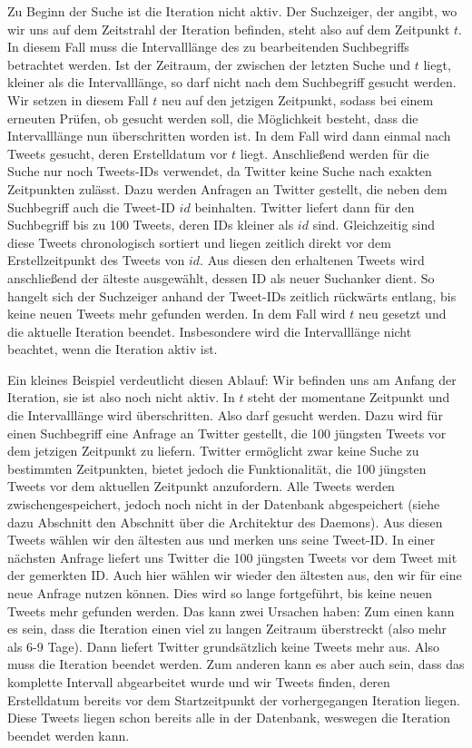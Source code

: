 Zu Beginn der Suche ist die Iteration nicht aktiv.
Der Suchzeiger, der angibt, wo wir uns auf dem Zeitstrahl der Iteration befinden, steht also auf dem Zeitpunkt $t$.
In diesem Fall muss die Intervalllänge des zu bearbeitenden Suchbegriffs betrachtet werden.
Ist der Zeitraum, der zwischen der letzten Suche und $t$ liegt, kleiner als die Intervalllänge, so darf nicht nach dem Suchbegriff gesucht werden.
Wir setzen in diesem Fall $t$ neu auf den jetzigen Zeitpunkt, sodass bei einem erneuten Prüfen, ob gesucht werden soll, die Möglichkeit besteht, dass die Intervalllänge nun überschritten worden ist.
In dem Fall wird dann einmal nach Tweets gesucht, deren Erstelldatum vor $t$ liegt.
Anschließend werden für die Suche nur noch Tweets-IDs verwendet, da Twitter keine Suche nach exakten Zeitpunkten zulässt.
Dazu werden Anfragen an Twitter gestellt, die neben dem Suchbegriff auch die Tweet-ID $id$ beinhalten.
Twitter liefert dann für den Suchbegriff bis zu 100 Tweets, deren IDs kleiner als $id$ sind.
Gleichzeitig sind diese Tweets chronologisch sortiert und liegen zeitlich direkt vor dem Erstellzeitpunkt des Tweets von $id$.
Aus diesen den erhaltenen Tweets wird anschließend der älteste ausgewählt, dessen ID als neuer Suchanker dient.
So hangelt sich der Suchzeiger anhand der Tweet-IDs zeitlich rückwärts entlang, bis keine neuen Tweets mehr gefunden werden.
In dem Fall wird $t$ neu gesetzt und die aktuelle Iteration beendet.
Insbesondere wird die Intervalllänge nicht beachtet, wenn die Iteration aktiv ist.

Ein kleines Beispiel verdeutlicht diesen Ablauf:
Wir befinden uns am Anfang der Iteration, sie ist also noch nicht aktiv.
In $t$ steht der momentane Zeitpunkt und die Intervalllänge wird überschritten.
Also darf gesucht werden.
Dazu wird für einen Suchbegriff eine Anfrage an Twitter gestellt, die 100 jüngsten Tweets vor dem jetzigen Zeitpunkt zu liefern.
Twitter ermöglicht zwar keine Suche zu bestimmten Zeitpunkten, bietet jedoch die Funktionalität, die 100 jüngsten Tweets vor dem aktuellen Zeitpunkt anzufordern.
Alle Tweets werden zwischengespeichert, jedoch noch nicht in der Datenbank abgespeichert (siehe dazu Abschnitt den Abschnitt über die Architektur des Daemons).
Aus diesen Tweets wählen wir den ältesten aus und merken uns seine Tweet-ID.
In einer nächsten Anfrage liefert uns Twitter die 100 jüngsten Tweets vor dem Tweet mit der gemerkten ID.
Auch hier wählen wir wieder den ältesten aus, den wir für eine neue Anfrage nutzen können.
Dies wird so lange fortgeführt, bis keine neuen Tweets mehr gefunden werden.
Das kann zwei Ursachen haben:
Zum einen kann es sein, dass die Iteration einen viel zu langen Zeitraum überstreckt (also mehr als 6-9 Tage).
Dann liefert Twitter grundsätzlich keine Tweets mehr aus.
Also muss die Iteration beendet werden.
Zum anderen kann es aber auch sein, dass das komplette Intervall abgearbeitet wurde und wir Tweets finden, deren Erstelldatum bereits vor dem Startzeitpunkt der vorhergegangen Iteration liegen.
Diese Tweets liegen schon bereits alle in der Datenbank, weswegen die Iteration beendet werden kann.

